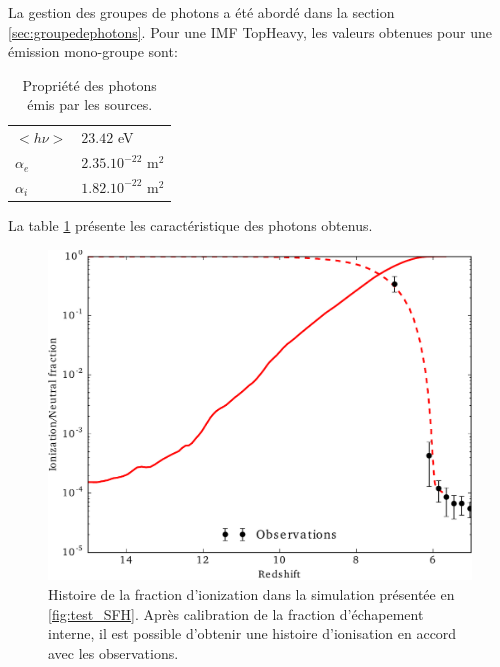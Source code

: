 La gestion des groupes de photons a été abordé dans la section \ref{sec:groupedephotons}.
Pour une IMF TopHeavy, les valeurs obtenues pour une émission mono-groupe sont:

\begin{table}
\begin{tabular}{l l }
	$<h\nu>$	&  $23.42$ eV \\
	$\alpha_e$	&  $2.35.10^{-22}$ m$^2$ \\
	$\alpha_i$	&  $1.82.10^{-22}$ m$^2$ \\
\end{tabular}
\caption{Propriété des photons émis par les sources.
\label{tab_photon}}
\end{table}

La table \ref{tab_photon} présente les caractéristique des photons obtenus.






%


\begin{figure}[bth]
        \includegraphics[width=.95\linewidth]{img/02/xion.pdf} 
        \caption{Histoire de la fraction d'ionization dans la simulation présentée en \ref{fig:test_SFH}.
        Après calibration de la fraction d'échapement interne, il est possible d'obtenir une histoire d'ionisation en accord avec les observations.
}
 		\label{fig:test_xion}
\end{figure}


